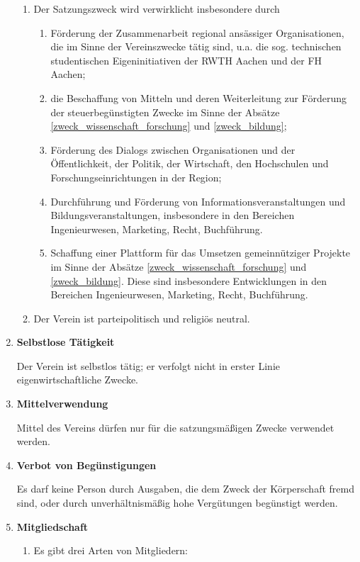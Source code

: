 \documentclass[german]{article}
\newcommand{\paragr}[1]{\item \textsf{\textbf{#1}}}
\begin{document}
\begin{enumerate}
\begin{enumerate}
\item Der Satzungszweck wird verwirklicht insbesondere durch
\begin{enumerate}
\item Förderung der Zusammenarbeit regional ansässiger Organisationen, die im Sinne der Vereinszwecke tätig sind, u.a. die sog. technischen studentischen Eigeninitiativen der RWTH Aachen und der FH Aachen;
\item die Beschaffung von Mitteln und deren Weiterleitung zur Förderung der steuerbegünstigten Zwecke im Sinne der Absätze \ref{zweck_wissenschaft_forschung} und \ref{zweck_bildung};
\item Förderung des Dialogs zwischen Organisationen und der Öffentlichkeit, der Politik, der Wirtschaft, den Hochschulen und Forschungseinrichtungen in der Region;
\item Durchführung und Förderung von Informationsveranstaltungen und Bildungsveranstaltungen, insbesondere in den Bereichen Ingenieurwesen, Marketing, Recht, Buchführung.
\item Schaffung einer Plattform für das Umsetzen gemeinnütziger Projekte im Sinne der Absätze \ref{zweck_wissenschaft_forschung} und \ref{zweck_bildung}. Diese sind insbesondere Entwicklungen in den Bereichen Ingenieurwesen, Marketing, Recht, Buchführung.
\end{enumerate}

\item Der Verein ist parteipolitisch und religiös neutral.

\end{enumerate}

\paragr{Selbstlose Tätigkeit}

Der Verein ist selbstlos tätig; er verfolgt nicht in erster Linie eigenwirtschaftliche Zwecke.


\paragr{Mittelverwendung}

Mittel des Vereins dürfen nur für die satzungsmäßigen Zwecke verwendet werden.


\paragr{Verbot von Begünstigungen}

Es darf keine Person durch Ausgaben, die dem Zweck der Körperschaft fremd sind, oder durch unverhältnismäßig hohe Vergütungen begünstigt werden.


\paragr{Mitgliedschaft}
\label{mitglieder}

\begin{enumerate}
\item Es gibt drei Arten von Mitgliedern:

\begin{enumerate}


\end{enumerate}
\end{enumerate}
\end{enumerate}
\end{document}
